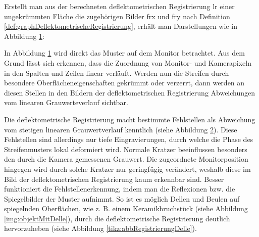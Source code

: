 \p
Erstellt man aus der berechneten deflektometrischen Registrierung \acrshort{lr} einer ungekrümmten Fläche die zugehörigen Bilder \acrshort{frx} und \acrshort{fry} nach Definition \ref{def:graphDeflektometrischeRegistrierung}, erhält man Darstellungen wie in Abbildung \ref{tikz:abbOptimaleSpaltenZeilenReg}:

{
	\begin{figure}[H]
		\centering
		
		\label{tikz:abbOptimaleSpaltenZeilenReg}
	\end{figure}
}

\noindent
In Abbildung \ref{tikz:abbOptimaleSpaltenZeilenReg} wird direkt das Muster auf dem Monitor betrachtet.
Aus dem Grund lässt sich erkennen, dass die Zuordnung von Monitor- und Kamerapixeln in den Spalten und Zeilen linear verläuft.
Werden nun die Streifen durch besondere Oberflächeneigenschaften gekrümmt oder verzerrt, dann werden an diesen Stellen in den Bildern der deflektometrischen Registrierung Abweichungen vom linearen Grauwerteverlauf sichtbar.

{
	\begin{figure}[H]
		\centering
		
		\label{tikz:abbBrillenglasRegistrierung}
	\end{figure}
}

\noindent
Die deflektometrische Registrierung macht bestimmte Fehlstellen als Abweichung vom stetigen linearen Grauwertverlauf kenntlich (siehe Abbildung \ref{tikz:abbBrillenglasRegistrierung}).
Diese Fehlstellen sind allerdings nur tiefe Eingravierungen, durch welche die Phase des Streifenmusters lokal deformiert wird.
Normale Kratzer beeinflussen besonders den durch die Kamera gemessenen Grauwert.
Die zugeordnete Monitorposition hingegen wird durch solche Kratzer nur geringfügig verändert, weshalb diese im Bild der deflektometrischen Registrierung kaum erkennbar sind.
Besser funktioniert die Fehlstellenerkennung, indem man die Reflexionen bzw. die Spiegelbilder der Muster aufnimmt.
So ist es möglich Dellen und Beulen auf spiegelnden Oberflächen, wie z. B. einem Keramikbruchstück (siehe Abbildung \ref{img:objektMitDelle}), durch die deflektometrische Registrierung deutlich hervorzuheben (siehe Abbildung \ref{tikz:abbRegistrierungDelle}).

